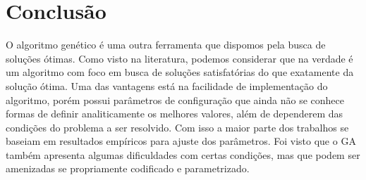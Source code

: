 \documentclass[
	12pt,				%
	openright,			%
	twoside,			%
	a4paper,			%
	english,			%
	brazil				%
	]{abntex2}
\begin{document}

%
%
%
%
%


\chapter{Conclusão}
\label{chap:conclusao}
O algoritmo genético é uma outra ferramenta que dispomos pela busca de soluções ótimas. Como visto na literatura, podemos considerar que na verdade é um algoritmo com foco em busca de soluções satisfatórias do que exatamente da solução ótima. Uma das vantagens está na facilidade de implementação do algoritmo, porém possui parâmetros de configuração que ainda não se conhece formas de definir analiticamente os melhores valores, além de dependerem das condições do problema a ser resolvido. Com isso a maior parte dos trabalhos se baseiam em resultados empíricos para ajuste dos parâmetros. Foi visto que o GA também apresenta algumas dificuldades com certas condições, mas que podem ser amenizadas se propriamente codificado e parametrizado. 
\end{document}
